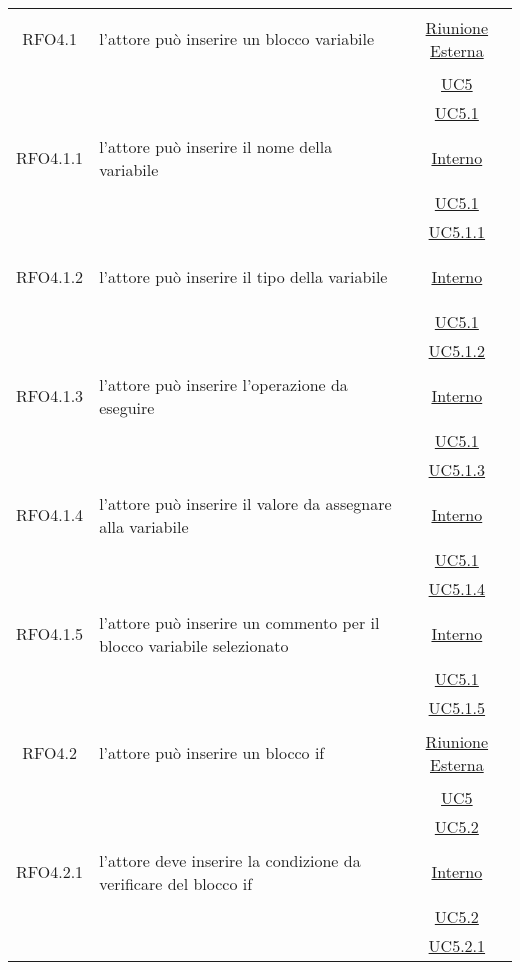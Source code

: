 \begin{longtable}{|c|>{\centering}m{7cm}|c|}
\hypertarget{RFO4.1}{RFO4.1} & l'attore può inserire un blocco variabile &  \hyperlink{Riunione Esterna}{Riunione Esterna}\\
& &\hyperref[UC5]{UC5}\\
& &\hyperref[UC5.1]{UC5.1}\\ \hline

\hypertarget{RFO4.1.1}{RFO4.1.1} & l'attore può inserire il nome della variabile & \hyperlink{Interno}{Interno}\\
& &\hyperref[UC5.1]{UC5.1}\\
& &\hyperref[UC5.1.1]{UC5.1.1}\\ \hline

\hypertarget{RFO4.1.2}{RFO4.1.2} & l'attore può inserire il tipo della variabile & \hyperlink{Interno}{Interno}\\
& &\hyperref[UC5.1]{UC5.1}\\
& &\hyperref[UC5.1.2]{UC5.1.2}\\ \hline

\hypertarget{RFO4.1.3}{RFO4.1.3} & l'attore può inserire l'operazione da eseguire & \hyperlink{Interno}{Interno}\\
& &\hyperref[UC5.1]{UC5.1}\\
& &\hyperref[UC5.1.3]{UC5.1.3}\\ \hline

\hypertarget{RFO4.1.4}{RFO4.1.4} & l'attore può inserire il valore da assegnare alla variabile &\hyperlink{Interno}{Interno}\\
& &\hyperref[UC5.1]{UC5.1}\\
& &\hyperref[UC5.1.4]{UC5.1.4}\\ \hline

\hypertarget{RFO4.1.5}{RFO4.1.5} & l'attore può inserire un commento per il blocco variabile selezionato&\hyperlink{Interno}{Interno}\\
& &\hyperref[UC5.1]{UC5.1}\\
& &\hyperref[UC5.1.5]{UC5.1.5}\\ \hline

\hypertarget{RFO4.2}{RFO4.2} & l'attore può inserire un blocco if & \hyperlink{Riunione Esterna}{Riunione Esterna}\\
& &\hyperref[UC5]{UC5}\\
& &\hyperref[UC5.2]{UC5.2}\\ \hline

\hypertarget{RFO4.2.1}{RFO4.2.1} & l'attore deve inserire la condizione da verificare del blocco if & \hyperlink{Interno}{Interno}\\
& &\hyperref[UC5.2]{UC5.2}\\
& &\hyperref[UC5.2.1]{UC5.2.1}\\ \hline


\end{longtable}
